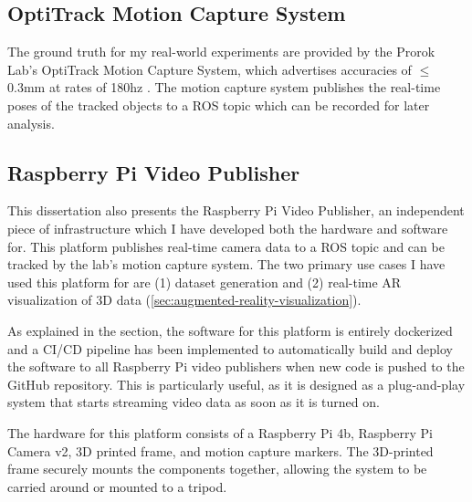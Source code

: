 \subsection{OptiTrack Motion Capture System}
\label{sec:optitrack-motion-capture-system}
The ground truth for my real-world experiments are provided by the Prorok Lab's OptiTrack Motion Capture System, which advertises accuracies of $\leq$0.3mm at rates of 180hz \autocite{OptiTrackForRobotics}. The motion capture system publishes the real-time poses of the tracked objects to a ROS topic which can be recorded for later analysis.

\subsection{Raspberry Pi Video Publisher}
\label{sec:raspberry-pi-video-publisher}
This dissertation also presents the Raspberry Pi Video Publisher, an independent piece of infrastructure which I have developed both the hardware and software for. This platform publishes real-time camera data to a ROS topic and can be tracked by the lab's motion capture system. The two primary use cases I have used this platform for are (1) dataset generation and (2) real-time AR visualization of 3D data (\autoref{sec:augmented-reality-visualization}).

As explained in the  section, the software for this platform is entirely dockerized and a CI/CD pipeline has been implemented to automatically build and deploy the software to all Raspberry Pi video publishers when new code is pushed to the GitHub repository. This is particularly useful, as it is designed as a plug-and-play system that starts streaming video data as soon as it is turned on.

The hardware for this platform consists of a Raspberry Pi 4b, Raspberry Pi Camera v2, 3D printed frame, and motion capture markers. The 3D-printed frame securely mounts the components together, allowing the system to be carried around or mounted to a tripod.

